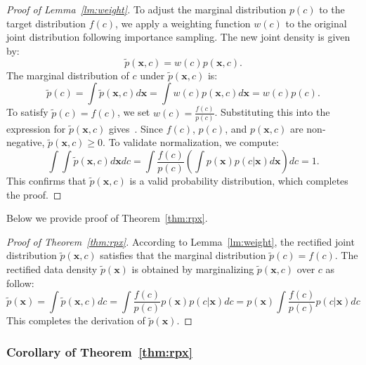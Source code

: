 \begin{proof}[Proof of Lemma~\ref{lm:weight}]
 To adjust the marginal distribution $p(c)$ to the target distribution $f(c)$, we apply a weighting function $w(c)$ to the original joint distribution following importance sampling. The new joint density is given by:
    \begin{equation}
 \tilde{p}(\boldsymbol{x}, c) = w(c) p(\boldsymbol{x}, c).
    \end{equation}
 The marginal distribution of $c$ under $\tilde{p}(\boldsymbol{x}, c)$ is:
    \begin{equation}
 \tilde{p}(c) = \int \tilde{p}(\boldsymbol{x}, c) d\boldsymbol{x} = \int w(c) p(\boldsymbol{x}, c) d\boldsymbol{x} = w(c) p(c).
    \end{equation}
 To satisfy $\tilde{p}(c) = f(c)$, we set $w(c) = \frac{f(c)}{p(c)}$. Substituting this into the expression for $\tilde{p}(\boldsymbol{x}, c)$ gives~. Since $f(c)$, $p(c)$, and $p(\boldsymbol{x}, c)$ are non-negative, $\tilde{p}(\boldsymbol{x}, c) \geq 0$. To validate normalization, we compute:
    \begin{equation}
        \int \int \tilde{p}(\boldsymbol{x}, c) d\boldsymbol{x} dc = \int \frac{f(c)}{p(c)} \left( \int p(\boldsymbol{x}) p(c | \boldsymbol{x}) d\boldsymbol{x} \right) dc = 1.
    \end{equation}
 This confirms that $\tilde{p}(\boldsymbol{x}, c)$ is a valid probability distribution, which completes the proof.
\end{proof}

Below we provide proof of Theorem~\ref{thm:rpx}.

\begin{proof}[Proof of Theorem~\ref{thm:rpx}]
According to Lemma~\ref{lm:weight}, the rectified joint distribution $\tilde{p}(\boldsymbol{x}, c)$ satisfies that the marginal distribution $\tilde{p}(c)=f(c)$. The rectified data density $\tilde{p}(\boldsymbol{x})$ is obtained by marginalizing $\tilde{p}(\boldsymbol{x}, c)$ over $c$ as follow:
    \begin{equation}
 \tilde{p}(\boldsymbol{x})=\int \tilde{p}(\boldsymbol{x},c) dc=\int\frac{f(c)}{p(c)}p(\boldsymbol{x})p(c|\boldsymbol{x}) dc=p(\boldsymbol{x})\int\frac{f(c)}{p(c)}p(c|\boldsymbol{x}) dc
    \end{equation}
 This completes the derivation of $\tilde{p}(\boldsymbol{x})$.
\end{proof}


\subsubsection{Corollary of Theorem~\ref{thm:rpx}}

